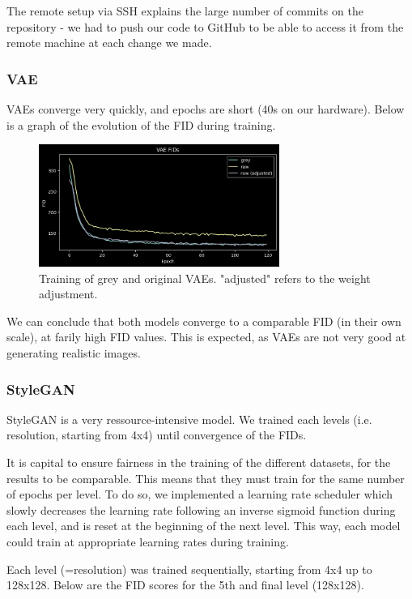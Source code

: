 \documentclass{article}
\begin{document}
The remote setup via SSH explains the large number of commits on the repository - we had to push our code to GitHub to be able to access it from the remote machine at each change we made.

\subsubsection*{VAE}

VAEs converge very quickly, and epochs are short (40s on our hardware). Below is a graph of the evolution of the FID during training.

\begin{figure}[H]
    \centering
    \includegraphics[width=0.7\textwidth]{images/vae_fids.png}
    \caption{Training of grey and original VAEs. "adjusted" refers to the weight adjustment.}
\end{figure}

We can conclude that both models converge to a comparable FID (in their own scale), at farily high FID values. This is expected, as VAEs are not very good at generating realistic images. 

\subsubsection*{StyleGAN}
StyleGAN is a very ressource-intensive model. 
We trained each levels (i.e. resolution, starting from 4x4) until convergence of the FIDs. 

It is capital to ensure fairness in the training of the different datasets, for the results to be comparable. This means that they must train for the same number of epochs per level. To do so, we implemented a learning rate scheduler which slowly decreases the learning rate following an inverse sigmoid function during each level, and is reset at the beginning of the next level. This way, each model could train at appropriate learning rates during training.

Each level (=resolution) was trained sequentially, starting from 4x4 up to 128x128. Below are the FID scores for the 5th and final level (128x128).
\end{document}
